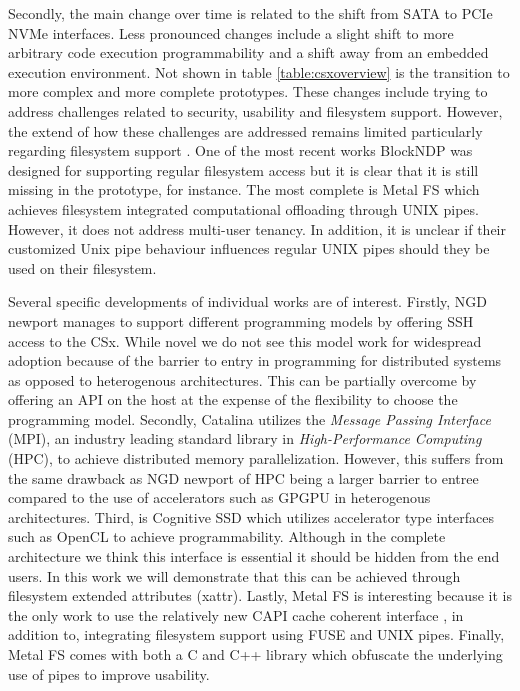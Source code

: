 Secondly, the main change over time is related to the shift from SATA to PCIe
NVMe interfaces. Less pronounced changes include a slight shift to more
arbitrary code execution programmability and a shift away from an embedded
execution environment. Not shown in table \ref{table:csxoverview} is the
transition to more complex and more complete prototypes. These changes include
trying to address challenges related to security, usability and filesystem
support. However, the extend of how these challenges are addressed remains
limited particularly regarding filesystem support \cite{barbalacecomputational}.
One of the most recent works BlockNDP \cite{10.1145/3429357.3430519} was
designed for supporting regular filesystem access but it is clear that it is
still missing in the prototype, for instance\footnotemark[4]. The most complete
is Metal FS \cite{10.1145/3342195.3387557} which achieves filesystem integrated
computational offloading through UNIX pipes. However, it does not address
multi-user tenancy. In addition, it is unclear if their customized Unix pipe
behaviour influences regular UNIX pipes should they be used on their filesystem.


Several specific developments of individual works are of interest. Firstly,
NGD newport \cite{10.1145/3415580} manages to support different programming
models by offering SSH access to the CSx. While novel we do not see this model
work for widespread adoption because of the barrier to entry in programming for
distributed systems as opposed to heterogenous architectures. This can be
partially overcome by offering an API on the host at the expense of the
flexibility to choose the programming model. Secondly, Catalina
\cite{8855540} utilizes the \textit{Message Passing Interface} (MPI), an
industry leading standard library in \textit{High-Performance Computing} (HPC),
to achieve distributed memory parallelization. However, this suffers from the
same drawback as NGD newport of HPC being a larger barrier to entree compared to
the use of accelerators such as GPGPU in heterogenous architectures. Third,
is Cognitive SSD \cite{8839401} which utilizes accelerator type interfaces such
as OpenCL to achieve programmability. Although in the complete architecture we
think this interface is essential it should be hidden from the end users. In
this work we will demonstrate that this can be achieved through filesystem
extended attributes (xattr). Lastly, Metal FS \cite{10.1145/3342195.3387557}
is interesting because it is the only work to use the relatively new CAPI
cache coherent interface \cite{Stuecheli2015CAPIAC}, in addition to, 
integrating filesystem support using FUSE and UNIX pipes. Finally, Metal FS
comes with both a C and C++ library which obfuscate the underlying use of pipes
to improve usability.

